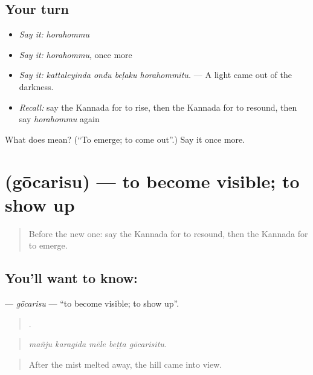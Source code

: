 \subsection*{Your turn}
\begin{itemize}
\raggedright
  \item \emph{Say it:} \emph{horahommu}
  \item \emph{Say it:} \emph{horahommu}, once more
  \item \emph{Say it:} \emph{kattaleyinda ondu beḷaku horahommitu.} — A light came out of the darkness.
  \item \emph{Recall:} say the Kannada for to rise, then the Kannada for to resound, then say \emph{horahommu} again
\end{itemize}

\begin{tcolorbox}[breakable,colback=teal!4,colframe=teal!35!black,title={Before you move on}]
What does  mean? (\textquotedblleft{}To emerge; to come out\textquotedblright{}.) Say it once more.
\end{tcolorbox}
\section[\texorpdfstring{\kn{ಗೋಚರಿಸು} (gōcarisu)}{ಗೋಚರಿಸು (gōcarisu)}]{ (gōcarisu) — to become visible; to show up}

\label{lesson:KA-C363-gocarisu}



\begin{quote}
Before the new one: say the Kannada for to resound, then the Kannada for to emerge.
\end{quote}

\subsection*{You'll want to know: }
\textbf{} — \emph{gōcarisu} — \textquotedblleft{}to become visible; to show up\textquotedblright{}.

\begin{quote}
    .
\end{quote}

\begin{quote}
\emph{mañju karagida mēle beṭṭa gōcarisitu.}
\end{quote}

\begin{quote}
After the mist melted away, the hill came into view.
\end{quote}

